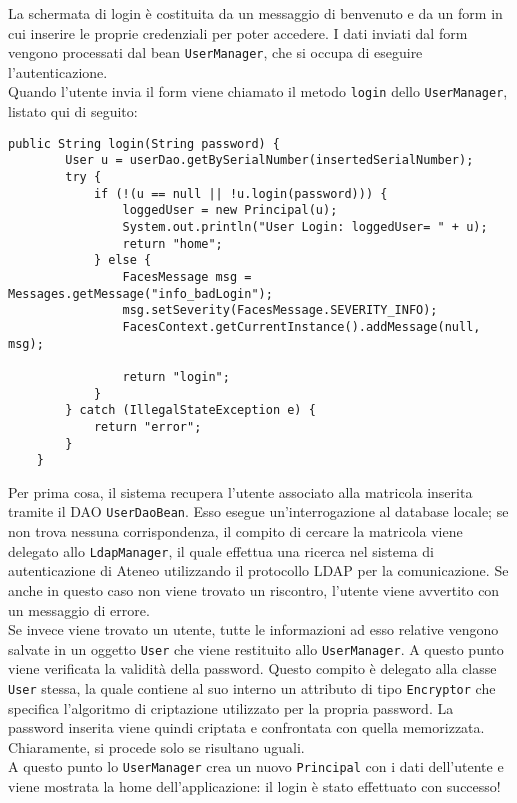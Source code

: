 

La schermata di login è costituita da un messaggio di benvenuto e da un form in cui inserire le proprie credenziali per poter accedere. I dati inviati dal form vengono processati dal bean \lstinline{UserManager}, che si occupa di eseguire l'autenticazione.\\
Quando l'utente invia il form viene chiamato il metodo \lstinline{login} dello \lstinline{UserManager}, listato qui di seguito:

\begin{lstlisting}
public String login(String password) {
		User u = userDao.getBySerialNumber(insertedSerialNumber);
		try {
			if (!(u == null || !u.login(password))) {
				loggedUser = new Principal(u);
				System.out.println("User Login: loggedUser= " + u);
				return "home";
			} else {
				FacesMessage msg = Messages.getMessage("info_badLogin");
				msg.setSeverity(FacesMessage.SEVERITY_INFO);
				FacesContext.getCurrentInstance().addMessage(null, msg);
				
				return "login";
			}
		} catch (IllegalStateException e) {
			return "error";
		}
	}
\end{lstlisting}

Per prima cosa, il sistema recupera l'utente associato alla matricola inserita tramite il DAO \lstinline{UserDaoBean}. Esso esegue un'interrogazione al database locale; se non trova nessuna corrispondenza, il compito di cercare la matricola viene delegato  allo \lstinline{LdapManager}, il quale effettua una ricerca nel sistema di autenticazione di Ateneo utilizzando il protocollo LDAP per la comunicazione. Se anche in questo caso non viene trovato un riscontro, l'utente viene avvertito con un messaggio di errore.\\
Se invece viene trovato un utente, tutte le informazioni ad esso relative vengono salvate in un oggetto \lstinline{User} che viene restituito allo \lstinline{UserManager}. A questo punto viene verificata la validità della password. Questo compito è delegato alla classe \lstinline{User} stessa, la quale contiene al suo interno un attributo di tipo \lstinline{Encryptor} che specifica l'algoritmo di criptazione utilizzato per la propria password. La password inserita viene quindi criptata e confrontata con quella memorizzata. Chiaramente, si procede solo se risultano uguali.\\
A questo punto lo \lstinline{UserManager} crea un nuovo \lstinline{Principal} con i dati dell'utente e viene mostrata la home dell'applicazione: il login è stato effettuato con successo!